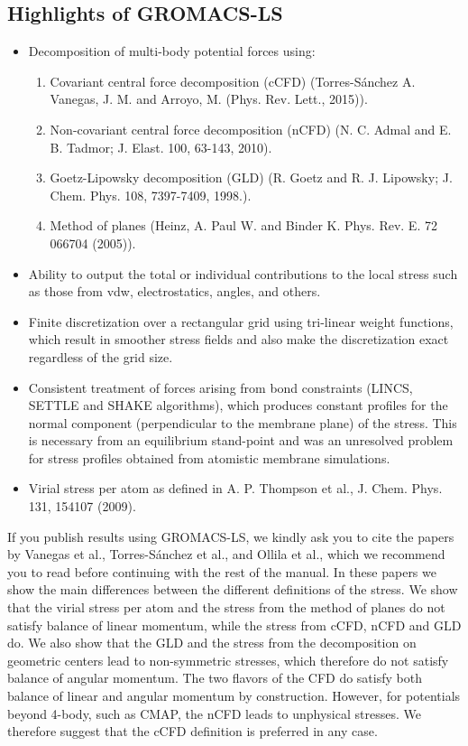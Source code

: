 \documentclass[10pt,letterpaper,notitlepage]{article}
\begin{document}
\subsection{Highlights of GROMACS-LS}
\begin{itemize}
    \item Decomposition of multi-body potential forces using:
    \begin{enumerate}
	\item Covariant central force decomposition (cCFD) (Torres-S\'anchez A. Vanegas, J. M. and Arroyo, M. (Phys. Rev. Lett., 2015)).
    \item Non-covariant central force decomposition (nCFD) (N. C. Admal and E. B. Tadmor; J. Elast. 100, 63-143, 2010).
    \item Goetz-Lipowsky decomposition (GLD) (R. Goetz and R. J. Lipowsky; J. Chem. Phys. 108, 7397-7409, 1998.). 
    \item Method of planes (Heinz, A.  Paul W. and Binder K. Phys. Rev. E. 72 066704 (2005)).
    \end{enumerate}
	\item Ability to output the total or individual contributions to the local stress such as those from vdw, electrostatics, angles, and others.
	\item Finite discretization over a rectangular grid using tri-linear weight functions, which result in smoother stress fields and also make the discretization exact regardless of the grid size.
	\item Consistent treatment of forces arising from bond constraints (LINCS, SETTLE and SHAKE algorithms), which produces constant profiles for the normal component (perpendicular to the membrane plane) of the stress. This is necessary from an equilibrium stand-point and was an unresolved problem for stress profiles obtained from atomistic membrane simulations.
	\item Virial stress per atom as defined in A. P. Thompson et al., J. Chem. Phys. 131, 154107 (2009). 
\end{itemize}

If you publish results using GROMACS-LS, we kindly ask you to cite the papers by Vanegas et al., Torres-S\'anchez et al., and Ollila et al., which we recommend you to read before continuing with the rest of the manual. In these papers we show the main differences between the different definitions of the stress. We show that the virial stress per atom and the stress from the method of planes do not satisfy balance of linear momentum, while the stress from cCFD, nCFD and GLD do. We also show that the GLD and the stress from the decomposition on geometric centers lead to non-symmetric stresses, which therefore do not satisfy balance of angular momentum. The two flavors of the CFD do satisfy both balance of linear and angular momentum by construction. However, for potentials beyond 4-body, such as CMAP, the nCFD leads to unphysical stresses. We therefore suggest that the cCFD definition is preferred in any case.
\end{document}
